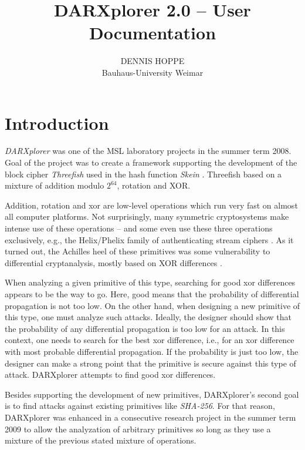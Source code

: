 \documentclass{acmtrans2m}
\title{DARXplorer 2.0 -- User Documentation}
\author{DENNIS HOPPE\\
      Bauhaus-University Weimar 
}
\begin{document}
    
\maketitle

%
%
\section{Introduction}
\label{section:einleitung}

\textit{DARXplorer} was one of the MSL laboratory projects in the summer term 2008.
Goal of the project was to create a framework supporting the development of the block 
cipher \textit{Threefish} used in the hash function \textit{Skein} \cite{Whiting:2009p11767}.
Threefish based on a mixture of addition modulo $2^{64}$, rotation and XOR.

Addition, rotation and xor are low-level operations which run very fast on almost all computer platforms. Not surprisingly, many symmetric cryptosystems make intense use of these operations – and some even use these three operations exclusively, e.g., the Helix/Phelix family of authenticating stream ciphers \cite{Whiting:2003p12154,Whiting:2005p2725}. As it turned out, the Achilles heel of these primitives was some vulnerability to differential cryptanalysis, mostly based on XOR differences \cite{Paul2005,Wu2006}.

When analyzing a given primitive of this type, searching for good xor differences appears to be the way to go. Here, good means that the probability of differential propagation is not too low. On the other hand, when designing a new primitive of this type, one must analyze such attacks. Ideally, the designer should show that the probability of any differential propagation is too low for an attack. In this context, one needs to search for the best xor difference, i.e., for an xor difference with most probable differential propagation. If the probability is just too low, the designer can make a strong point that the primitive is secure against this type of attack. DARXplorer attempts to find good xor differences.

Besides supporting the development of new primitives, DARXplorer's second goal is to find 
attacks against existing primitives like \textit{SHA-256}. For that reason, DARXplorer
was enhanced in a consecutive research project in the summer term 2009 to allow the 
analyzation of arbitrary primitives so long as they use a mixture of the previous stated 
mixture of operations.
\end{document}

